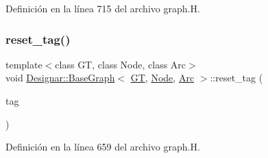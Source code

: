 Definición en la línea 715 del archivo graph.\+H.

\mbox{\label{class_designar_1_1_base_graph_ae8845b2eb9d33f62684c8e5acc7c91b7}} 
\subsubsection{\texorpdfstring{reset\+\_\+tag()}{reset\_tag()}}
{\footnotesize\ttfamily template$<$class GT, class Node, class Arc$>$ \\
void \hyperlink{class_designar_1_1_base_graph}{Designar\+::\+Base\+Graph}$<$ \hyperlink{demo-buildgraph_8_c_a3001c40d2c31ca87ed96cd7d1334a55e}{GT}, \hyperlink{namespace_designar_a5af326c65aa2bd26b26c410f2030d09e}{Node}, \hyperlink{namespace_designar_a3f55fb5513d62ff47cbc8f72b8e95d6f}{Arc} $>$\+::reset\+\_\+tag (\begin{DoxyParamCaption}\item[{\hyperlink{namespace_designar_ac91366256ea6ea6ac5fd483d55a7499e}{Graph\+Tag}}]{tag }\end{DoxyParamCaption})\hspace{0.3cm}{\ttfamily [inline]}}



Definición en la línea 659 del archivo graph.\+H.

\mbox{\label{class_designar_1_1_base_graph_a4c9703fdb22d4e1d3cf0428fd705b3ee}} 

